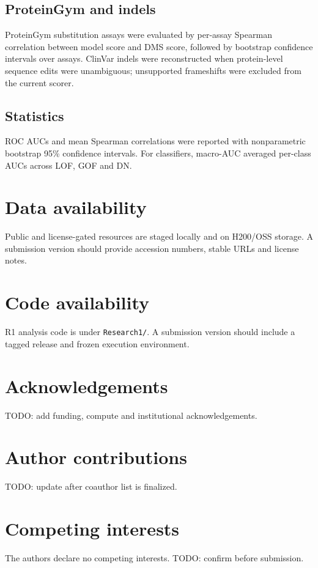 \documentclass[pdflatex,sn-nature]{sn-jnl}
\begin{document}
\subsection{ProteinGym and indels}

ProteinGym substitution assays were evaluated by per-assay Spearman correlation between model score and DMS score, followed by bootstrap confidence intervals over assays. ClinVar indels were reconstructed when protein-level sequence edits were unambiguous; unsupported frameshifts were excluded from the current scorer.

\subsection{Statistics}

ROC AUCs and mean Spearman correlations were reported with nonparametric bootstrap 95\% confidence intervals. For classifiers, macro-AUC averaged per-class AUCs across LOF, GOF and DN.

\section*{Data availability}

Public and license-gated resources are staged locally and on H200/OSS storage. A submission version should provide accession numbers, stable URLs and license notes.

\section*{Code availability}

R1 analysis code is under \texttt{Research1/}. A submission version should include a tagged release and frozen execution environment.

\section*{Acknowledgements}

TODO: add funding, compute and institutional acknowledgements.

\section*{Author contributions}

TODO: update after coauthor list is finalized.

\section*{Competing interests}

The authors declare no competing interests. TODO: confirm before submission.


\end{document}
